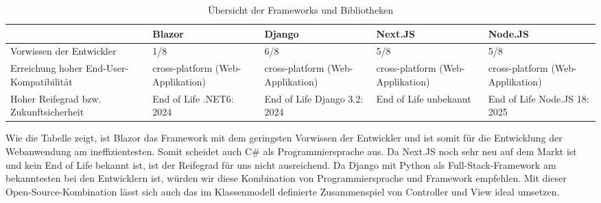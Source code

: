 \begin{table}
  \begin{tabular} {|m{3cm}|m{3cm}|m{3cm}|m{3cm}|m{3cm}|}
    \hline
    & Blazor & Django & Next.JS & Node.JS \\
    \hline
    Vorwissen der Entwickler & 1/8 & 6/8 & 5/8 & 5/8 \\
    \hline
    Erreichung hoher End-User-Kompatibilität & cross-platform (Web-Applikation) & cross-platform (Web-Applikation) & cross-platform (Web-Applikation) & cross-platform (Web-Applikation) \\
    \hline
    Hoher Reifegrad bzw. Zukunftsicherheit & End of Life .NET6: 2024\cite{noauthor_.net_nodate} & End of Life Django 3.2: 2024\cite{noauthor_django_nodate} & End of Life unbekannt & End of Life Node.JS 18: 2025\cite{noauthor_node.js_nodate}\\
    \hline
  \end{tabular}
  \caption{Übersicht der Frameworks und Bibliotheken}
  \label{tab:frameworks}
\end{table}

Wie die Tabelle zeigt, ist Blazor das Framework mit dem geringsten Vorwissen der Entwickler und ist somit für die Entwicklung der Webanwendung am ineffizientesten.
Somit scheidet auch C\# als Programmiersprache aus.
Da Next.JS noch sehr neu auf dem Markt ist und kein End of Life bekannt ist, ist der Reifegrad für uns nicht ausreichend.
Da Django mit Python als Full-Stack-Framework am bekanntesten bei den Entwicklern ist, würden wir diese Kombination von Programmiersprache und Framework empfehlen.
Mit dieser Open-Source-Kombination lässt sich auch das im Klassenmodell definierte Zusammenspiel von Controller und View ideal umsetzen.




